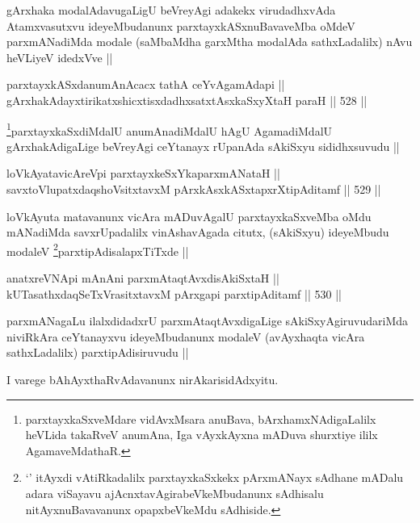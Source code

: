 \begin{artha}
gArxhaka modalAdavugaLigU beVreyAgi adakekx virudadhxvAda Atamxvasutxvu ideyeMbudanunx parxtayxkASxnuBavaveMba oMdeV parxmANadiMda modale (saMbaMdha garxMtha modalAda sathxLadalilx) nAvu heVLiyeV idedxVve ||
\end{artha}


\begin{shl}
parxtayxkASxdanumAnAcacx tathA ceYvA\s \s gamAdapi || \\
gArxhakAdayxtirikatxshicxtisxdadhxsatxtAsxkaSxyXtaH paraH ||  528 ||  
\end{shl}

\begin{artha}
\footnote{parxtayxkaSxveMdare vidAvxMsara anuBava, bArxhamxNAdigaLalilx heVLida takaRveV anumAna, Iga vAyxkAyxna mADuva shurxtiye ililx AgamaveMdathaR.}parxtayxkaSxdiMdalU anumAnadiMdalU hAgU AgamadiMdalU gArxhakAdigaLige beVreyAgi ceYtanayx rUpanAda sAkiSxyu sididhxsuvudu ||
\end{artha}


\begin{shl}
loVkAyatavicAreV\s pi parxtayxkeSxYkaparxmANataH || \\
savxtoV\s lupatxdaqshoV\s sitxtavxM pArxkAsxkASxtapxrXtipAditamf ||  529 ||  
\end{shl}

\begin{artha}
loVkAyuta matavanunx vicAra mADuvAgalU parxtayxkaSxveMba oMdu mANadiMda savxrUpadalilx vinAshavAgada citutx, (sAkiSxyu) ideyeMbudu modaleV \footnote{`\stext' itAyxdi vAtiRkadalilx parxtayxkaSxkekx pArxmANayx sAdhane mADalu adara viSayavu ajAcnxtavAgirabeVkeMbudanunx sAdhisalu nitAyxnuBavavanunx opapxbeVkeMdu sAdhiside.}parxtipAdisalapxTiTxde ||
\end{artha}


\begin{shl}
anatxreVNApi mAnAni parxmAtaqtAvxdisAkiSxtaH || \\
kUTasathxdaqSeTxVrasitxtavxM pArxgapi parxtipAditamf ||  530 ||  
\end{shl}

\begin{artha}
parxmANagaLu ilalxdidadxrU parxmAtaqtAvxdigaLige sAkiSxyAgiruvudariMda niviRkAra ceYtanayxvu ideyeMbudanunx modaleV (avAyxhaqta vicAra sathxLadalilx) parxtipAdisiruvudu ||

I varege bAhAyxthaRvAdavanunx nirAkarisidAdxyitu.
\end{artha}

